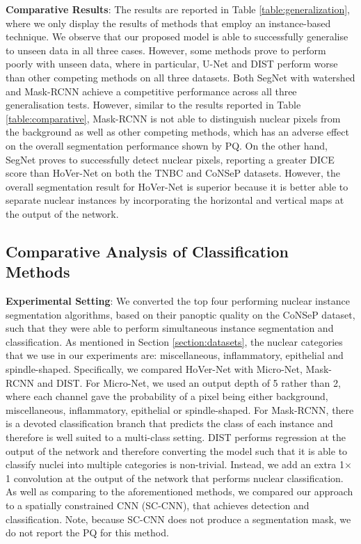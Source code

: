 \documentclass[journal]{IEEEtran}
\begin{document}
	
	\textbf{Comparative Results}: The results are reported in Table \ref{table:generalization}, where we only display the results of methods that employ an instance-based technique. We observe that our proposed model is able to successfully generalise to unseen data in all three cases. However, some methods prove to perform poorly with unseen data, where in particular, U-Net and DIST perform worse than other competing methods on all three datasets. Both SegNet with watershed and Mask-RCNN achieve a competitive performance across all three generalisation tests. However, similar to the results reported in Table \ref{table:comparative}, Mask-RCNN is not able to distinguish nuclear pixels from the background as well as other competing methods, which has an adverse effect on the overall segmentation performance shown by PQ. On the other hand, SegNet proves to successfully detect nuclear pixels, reporting a greater DICE score than HoVer-Net on both the TNBC and CoNSeP datasets. However, the overall segmentation result for HoVer-Net is superior because it is better able to separate nuclear instances by incorporating the horizontal and vertical maps at the output of the network. 

	\subsection{Comparative Analysis of Classification Methods} \label{section:comparison_class}
	
	\textbf{Experimental Setting}: We converted the top four performing nuclear instance segmentation algorithms, based on their panoptic quality on the CoNSeP dataset, such that they were able to perform simultaneous instance segmentation and classification. As mentioned in Section \ref{section:datasets}, the nuclear categories that we use in our experiments are: miscellaneous, inflammatory, epithelial and spindle-shaped. Specifically, we compared HoVer-Net with Micro-Net, Mask-RCNN and DIST. For Micro-Net, we used an output depth of 5 rather than 2, where each channel gave the probability of a pixel being either background, miscellaneous, inflammatory, epithelial or spindle-shaped. For Mask-RCNN, there is a devoted classification branch that predicts the class of each instance and therefore is well suited to a multi-class setting. DIST performs regression at the output of the network and therefore converting the model such that it is able to classify nuclei into multiple categories is non-trivial. Instead, we add an extra 1$\times$1 convolution at the output of the network that performs nuclear classification. As well as comparing to the aforementioned methods, we compared our approach to a spatially constrained CNN (SC-CNN), that achieves detection and classification. Note, because SC-CNN does not produce a segmentation mask, we do not report the PQ for this method.
	
\end{document}
